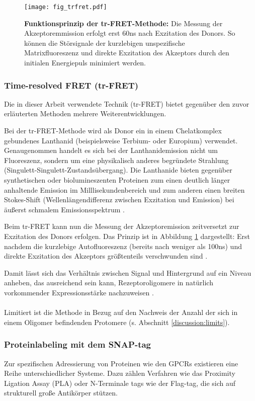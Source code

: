 
\begin{figure}[htbp]
	\centering
    \texttt{[image: fig\_trfret.pdf]}
    \caption{\textbf{Funktionsprinzip der tr-FRET-Methode:} Die Messung der Akzeptoremmission erfolgt erst 60\si{\nano\second} nach Exzitation des Donors. So können die Störsignale der kurzlebigen unspezifische Matrixfluoreszenz und direkte Exzitation des Akzeptors durch den initialen Energiepuls minimiert werden.} 
    \label{fig:trfret}
\end{figure}

\subsubsection{Time-resolved FRET (tr-FRET)}
Die in dieser Arbeit verwendete Technik (tr-FRET) bietet gegenüber den zuvor erläuterten Methoden mehrere Weiterentwicklungen.

Bei der tr-FRET-Methode wird als Donor ein in einem Chelatkomplex gebundenes Lanthanid (beispielsweise Terbium- oder Europium) verwendet. Genaugenommen handelt es sich bei der Lanthanidemission nicht um Fluoreszenz, sondern um eine physikalisch anderes begründete Strahlung (Singulett-Singulett-Zustandsübergang). Die Lanthanide bieten gegenüber synthetischen oder biolumineszenten Proteinen zum einen deutlich länger anhaltende Emission im Milllisekundenbereich und zum anderen einen breiten Stokes-Shift (Wellenlängendifferenz zwischen Exzitation und Emission) bei äußerst schmalem Emissionsspektrum \parencite{Selvin1994, Selvin2002}.

Beim tr-FRET kann nun die Messung der Akzeptoremission zeitversetzt zur Exzitation des Donors erfolgen. Das Prinzip ist in Abbildung \ref{fig:trfret} dargestellt: Erst nachdem die kurzlebige Autofluoreszenz (bereits nach weniger als 100\si{\nano\second}) und direkte Exzitation des Akzeptors größtenteils verschwunden sind \parencite{Selvin2002}. 

Damit lässt sich das Verhältnis zwischen Signal und Hintergrund auf ein Niveau anheben, das ausreichend sein kann, Rezeptoroligomere in natürlich vorkommender Expressionsstärke nachzuweisen \parencite{Albizu2010}.
\\ \\
Limitiert ist die Methode in Bezug auf den Nachweis der Anzahl der sich in einem Oligomer befindenden Protomere (s. Abschnitt \ref{discussion:limits}). 

\subsubsection{Proteinlabeling mit dem SNAP-tag}
Zur spezifischen Adressierung von Proteinen wie den GPCRs existieren eine Reihe unterschiedlicher Systeme. Dazu zählen Verfahren wie das Proximity Ligation Assay (PLA) \parencite{Soderberg2006} oder  N-Terminale tags wie der Flag-tag, die sich auf strukturell große Antikörper stützen. 

